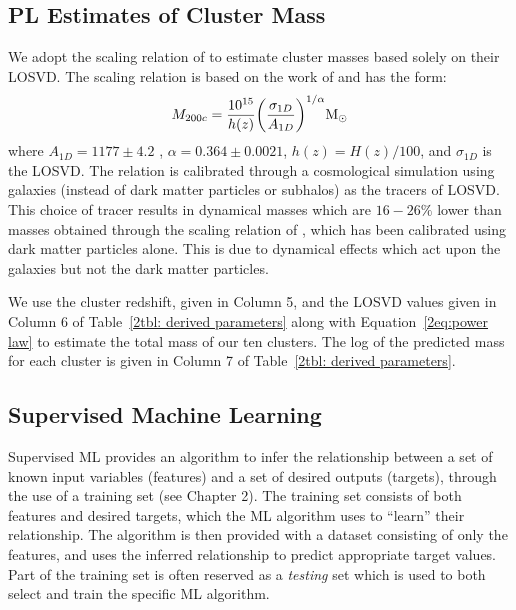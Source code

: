 \subsection{PL Estimates of Cluster Mass}
We adopt the scaling relation of \cite{Munari2013} to estimate cluster masses based solely on their LOSVD. The scaling relation is based on the work of \cite{Evrard2008} and has the form: 
\begin{equation}\label{2eq:power law}
	M_{200c} = \frac{10^{15}}{h(z)} \bigg{(}\frac{\sigma_{1D}}{A_{1D}} \bigg{)}^{1/\alpha} \hbox{$\mathrm{M}_\odot$} 
\end{equation}
where $A_{1D} =1177\pm4.2$ \kms, $\alpha = 0.364\pm0.0021$, $h(z) = H(z)/100$, and $\sigma_{1D}$ is the LOSVD. The relation is calibrated through a cosmological simulation using galaxies (instead of dark matter particles or subhalos) as the tracers of LOSVD. This choice of tracer results in dynamical masses which are $16-26\%$ lower  than masses obtained through the scaling relation of \cite{Evrard2008}, which has been calibrated using dark matter particles alone. This is due to dynamical effects which act upon the galaxies but not the dark matter particles.

We use the cluster redshift, given in Column 5, and the LOSVD values given in Column 6 of Table~\ref{2tbl: derived parameters} along with Equation~\ref{2eq:power law} to estimate the total mass of our ten clusters. The log of the predicted mass for each cluster is given in Column 7 of Table~\ref{2tbl: derived parameters}.

\subsection{Supervised Machine Learning}\label{2sec:ML methods}
Supervised ML provides an algorithm to infer the relationship between a set of known input variables (features) and a set of desired outputs (targets), through the use of a training set (see Chapter 2). The training set consists of both features and desired targets, which the ML algorithm uses to ``learn'' their relationship. The algorithm is then provided with a dataset consisting of only the features, and uses the inferred relationship to predict appropriate target values. Part of the training set is often reserved as a \emph{testing} set  which is used to both select and train the specific ML algorithm.

